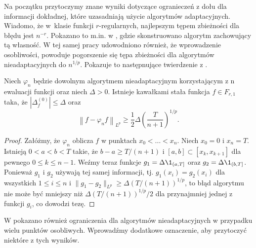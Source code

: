 \documentclass[oik, pdftex, man]{mgrwms}
\begin{document}
    Na początku przytoczymy znane wyniki dotyczące ogranieczeń z dołu dla informacji dokładnej, które uzasadniają użycie algorytmów adaptacyjnych. Wiadomo, że w~klasie funkcji $r$-regularnych, najlepszym tępem zbieżności dla błędu jest $n^{-r}$. Pokazano to m.in. w \cite{PoA}, gdzie skonstruowano algorytm zachowujący tą własność. W tej samej pracy udowodniono również, że wprowadzenie osobliwości, powoduje pogorszenie się tępa zbieżności dla algorytmów nieadaptacyjnych do $n^{1/p}$. Pokazuje to następnujące twierdzenie z \cite{PoA}.

    \begin{thm}
        Niech $\varphi_{n}$ będzie dowolnym algorytmem nieadaptacyjnym korzystającym z n ewaluacji funkcji oraz niech $\Delta > 0$. Istnieje kawałkami stała funkcja $f \in F_{r, 1}$ taka, że $|\Delta_{f}^{(0)}| \leq \Delta$ oraz
        \begin{equation*}
            \left\| f - \varphi_{n}f \right\|_{L^{p}} \geq \frac{1}{2}\Delta \left( \frac{T}{n+1} \right)^{1/p}.
        \end{equation*}
    \end{thm}
    \begin{proof}
        Załóżmy, że $\varphi_{n}$ oblicza $f$ w punktach $x_{0} < \ldots < x_{n}$. Niech $x_{0} = 0$ i $x_{n} = T$. Istnieją $0 < a < b < T$ takie, że $b-a \geq T/(n+1)$ i $[a,b] \subset [x_{k}, x_{k+1}]$ dla pewnego $0 \leq k \leq n-1$. Weźmy teraz funkcje $g_{1} = \Delta\1_{(a, T]}$ oraz $g_{2} = \Delta\1_{(b, T]}$. Ponieważ $g_{1}$ i $g_{2}$ używają tej samej informacji, tj. $g_{1}(x_{i}) = g_{2}(x_{i})$ dla wszystkich $1 \leq i \leq n$ i $\| g_{1} - g_{2} \|_{L^{p}} \geq \Delta(T / (n+1))^{1/p}$, to błąd algorytmu nie może być mniejszy niż $\Delta(T/(n+1))^{1/p} / 2$ dla przynajmniej jednej z funkcji $g_{i}$, co dowodzi tezę.
    \end{proof}

    W \cite{PoA} pokazano również ograniczenia dla algorytmów nieadaptacyjnych w przypadku wielu punktów osobliwych. Wprowadźmy dodatkowe oznaczenie, aby przytoczyć niektóre z tych wyników.
    
\end{document}
